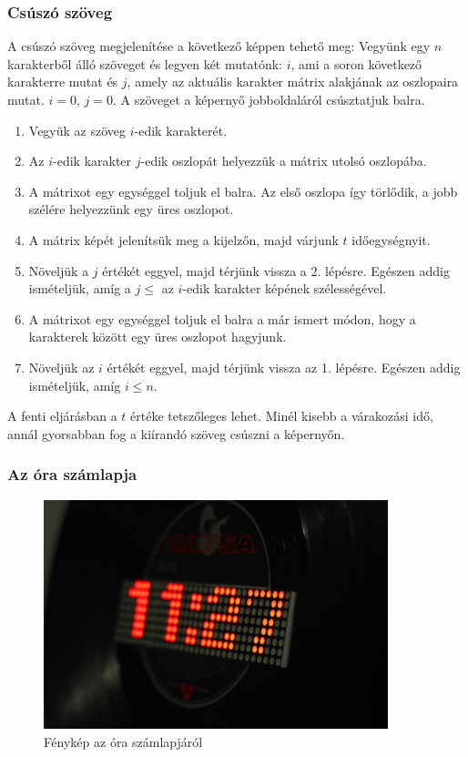 \documentclass[a4paper, 12pt]{article}
\begin{document}
\subsubsection{Csúszó szöveg} \label{csuszo}
A csúszó szöveg megjelenítése a következő képpen tehető meg:
Vegyünk egy $n$ karakterből álló szöveget és legyen két mutatónk: $i$, ami a soron következő karakterre mutat és $j$, amely az aktuális karakter mátrix alakjának az oszlopaira mutat. $i = 0$, $j = 0$.
A szöveget a képernyő jobboldaláról csúsztatjuk balra.
\begin{enumerate}
	\item Vegyük az szöveg $i$-edik karakterét.
	\item Az $i$-edik karakter $j$-edik oszlopát helyezzük a mátrix utolsó oszlopába.
	\item A mátrixot egy egységgel toljuk el balra. Az első oszlopa így törlődik, a jobb szélére helyezzünk egy üres oszlopot.
	\item A mátrix képét jelenítsük meg a kijelzőn, majd várjunk $t$ időegységnyit.
	\item Növeljük a $j$ értékét eggyel, majd térjünk vissza a 2. lépésre. Egészen addig ismételjük, amíg a $j \leq$ az $i$-edik karakter képének szélességével.
	\item A mátrixot egy egységgel toljuk el balra a már ismert módon, hogy a karakterek között egy üres oszlopot hagyjunk.
	\item Növeljük az $i$ értékét eggyel, majd térjünk vissza az 1. lépésre. Egészen addig ismételjük, amíg $i \leq n$.
\end{enumerate}

A fenti eljárásban a $t$ értéke tetszőleges lehet. Minél kisebb a várakozási idő, annál gyorsabban fog a kiírandó szöveg csúszni a képernyőn.

\subsubsection{Az óra számlapja}

\begin{figure}[ht]
	\centering
	\includegraphics[width = 10cm]{images/clockface.JPG}
	\caption{Fénykép az óra számlapjáról}
	\label{fig:clockface}
\end{figure}	
\end{document}
